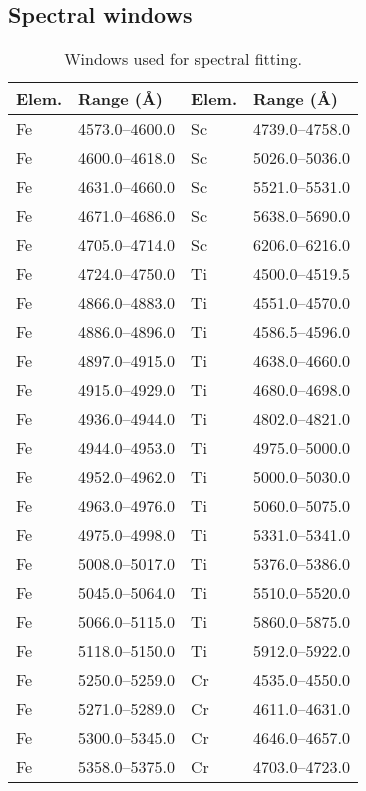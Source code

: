 \documentclass{aa}
\begin{document}
\begin{appendix}
\clearpage

\section{Spectral windows}
\label{app:specwin}

\begin{table}[!h]
\caption{Windows used for spectral fitting.}
\label{tab:windows}
\begin{adjustbox}{height=0.45\textheight}
\centering
\small
\begin{tabular}{l l l l}
\hline\hline
 Elem. & Range (\AA) & Elem. & Range (\AA) \\
\hline
Fe & 4573.0--4600.0 & Sc & 4739.0--4758.0 \\
Fe & 4600.0--4618.0 & Sc & 5026.0--5036.0 \\
Fe & 4631.0--4660.0 & Sc & 5521.0--5531.0 \\
Fe & 4671.0--4686.0 & Sc & 5638.0--5690.0 \\
Fe & 4705.0--4714.0 & Sc & 6206.0--6216.0 \\
Fe & 4724.0--4750.0 & Ti & 4500.0--4519.5 \\
Fe & 4866.0--4883.0 & Ti & 4551.0--4570.0 \\
Fe & 4886.0--4896.0 & Ti & 4586.5--4596.0 \\
Fe & 4897.0--4915.0 & Ti & 4638.0--4660.0 \\
Fe & 4915.0--4929.0 & Ti & 4680.0--4698.0 \\
Fe & 4936.0--4944.0 & Ti & 4802.0--4821.0 \\
Fe & 4944.0--4953.0 & Ti & 4975.0--5000.0 \\
Fe & 4952.0--4962.0 & Ti & 5000.0--5030.0 \\
Fe & 4963.0--4976.0 & Ti & 5060.0--5075.0 \\
Fe & 4975.0--4998.0 & Ti & 5331.0--5341.0 \\
Fe & 5008.0--5017.0 & Ti & 5376.0--5386.0 \\
Fe & 5045.0--5064.0 & Ti & 5510.0--5520.0 \\
Fe & 5066.0--5115.0 & Ti & 5860.0--5875.0 \\
Fe & 5118.0--5150.0 & Ti & 5912.0--5922.0 \\
Fe & 5250.0--5259.0 & Cr & 4535.0--4550.0 \\
Fe & 5271.0--5289.0 & Cr & 4611.0--4631.0 \\
Fe & 5300.0--5345.0 & Cr & 4646.0--4657.0 \\
Fe & 5358.0--5375.0 & Cr & 4703.0--4723.0 \\

\end{tabular}
\end{adjustbox}
\end{table}
\end{appendix}
\end{document}
